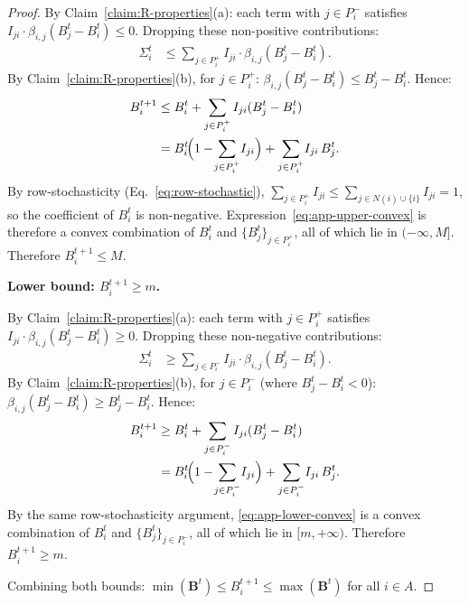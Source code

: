 \begin{proof}
  By Claim~\ref{claim:R-properties}(a):
  each term with $j\in P^-_i$ satisfies
  $I_{ji}\cdot\beta_{i,j}(B_j^t-B_i^t)\le 0$.
  Dropping these non-positive contributions:
  \begin{align}
    \Sigma_i^t
    &\le \sum_{j\in P^+_i} I_{ji}\cdot\beta_{i,j}(B_j^t-B_i^t).
    \label{eq:app-sigma-upper}
  \end{align}
  By Claim~\ref{claim:R-properties}(b), for $j\in P^+_i$:
  $\beta_{i,j}(B_j^t-B_i^t)\le B_j^t-B_i^t$.
  Hence:
  \begin{align}
    B_i^{t+1}
    &\le B_i^t
      + \sum_{j\in P^+_i} I_{ji}(B_j^t-B_i^t)\notag\\
    &= B_i^t\!\Bigl(1-\!\sum_{j\in P^+_i}\!I_{ji}\Bigr)
      + \sum_{j\in P^+_i}\!I_{ji}\,B_j^t.
    \label{eq:app-upper-convex}
  \end{align}
  By row-stochasticity (Eq.~\eqref{eq:row-stochastic}),
  $\sum_{j\in P^+_i}I_{ji}\le
   \sum_{j\in N(i)\cup\{i\}}I_{ji}=1$,
  so the coefficient of $B_i^t$ is non-negative.
  Expression~\eqref{eq:app-upper-convex} is therefore a convex
  combination of $B_i^t$ and $\{B_j^t\}_{j\in P^+_i}$,
  all of which lie in $(-\infty,M]$.
  Therefore $B_i^{t+1}\le M$.

  \medskip\noindent\textbf{Lower bound: $B_i^{t+1}\ge m$.}

  By Claim~\ref{claim:R-properties}(a):
  each term with $j\in P^+_i$ satisfies
  $I_{ji}\cdot\beta_{i,j}(B_j^t-B_i^t)\ge 0$.
  Dropping these non-negative contributions:
  \begin{align}
    \Sigma_i^t
    &\ge \sum_{j\in P^-_i} I_{ji}\cdot\beta_{i,j}(B_j^t-B_i^t).
    \label{eq:app-sigma-lower}
  \end{align}
  By Claim~\ref{claim:R-properties}(b), for $j\in P^-_i$
  (where $B_j^t-B_i^t<0$): $\beta_{i,j}(B_j^t-B_i^t)\ge B_j^t-B_i^t$.
  Hence:
  \begin{align}
    B_i^{t+1}
    &\ge B_i^t
      + \sum_{j\in P^-_i} I_{ji}(B_j^t-B_i^t)\notag\\
    &= B_i^t\!\Bigl(1-\!\sum_{j\in P^-_i}\!I_{ji}\Bigr)
      + \sum_{j\in P^-_i}\!I_{ji}\,B_j^t.
    \label{eq:app-lower-convex}
  \end{align}
  By the same row-stochasticity argument,
  \eqref{eq:app-lower-convex} is a convex combination of $B_i^t$
  and $\{B_j^t\}_{j\in P^-_i}$, all of which lie in $[m,+\infty)$.
  Therefore $B_i^{t+1}\ge m$.

  \medskip\noindent Combining both bounds:
  $\min(\mathbf{B}^t)\le B_i^{t+1}\le\max(\mathbf{B}^t)$
  for all $i\in A$.
\end{proof}
